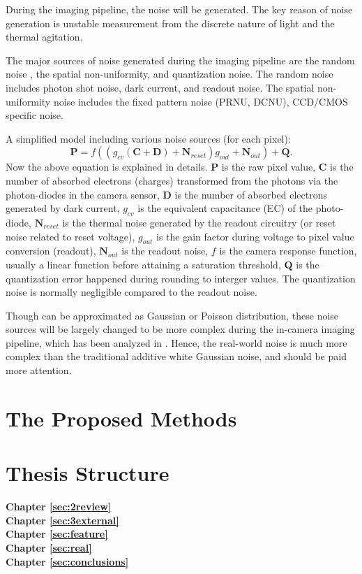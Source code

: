 During the imaging pipeline, the noise will be generated. The key reason of noise generation is unstable measurement from the discrete nature of light and the thermal agitation. 

The major sources of noise generated during the imaging pipeline are the random noise , the spatial non-uniformity, and quantization noise. The random noise includes photon shot noise, dark current, and readout noise. The spatial non-uniformity noise includes the fixed pattern noise (PRNU, DCNU), CCD/CMOS specific noise. 


A simplified model including various noise sources (for each pixel):
\begin{equation}
\bm{P} = f((g_{cv}(\bm{C}+\bm{D})+\bm{N}_{reset})g_{out}+\bm{N}_{out})+\bm{Q}.
\end{equation}
Now the above equation is explained in details. 
$\bm{P}$ is the raw pixel value, 
$\bm{C}$ is the number of absorbed electrons (charges) transformed from the photons via the photon-diodes in the camera sensor,
$\bm{D}$ is the number of absorbed electrons generated by dark current,
$g_{cv}$ is the equivalent capacitance (EC) of the photo-diode,
$\bm{N}_{reset}$ is the thermal noise generated by the readout circuitry (or reset noise related to reset voltage),
$g_{out}$ is the gain factor during voltage to pixel value conversion (readout),
$\bm{N}_{out}$ is the readout noise,
$f$ is the camera response function, usually a linear function before attaining a saturation threshold,
$\bm{Q}$ is the quantization error happened during rounding to interger values. The quantization noise is normally negligible compared to the readout noise.

Though can be approximated as Gaussian or Poisson distribution, these noise sources will be largely changed to be more complex during the in-camera imaging pipeline, which has been analyzed in \cite{crosschannel}. Hence, the real-world noise is much more complex than the traditional additive white Gaussian noise, and should be paid more attention.


\section{The Proposed Methods}
\label{sec:intro:new}




\section{Thesis Structure}
\label{sec:intro:structure}


\textbf{Chapter \ref{sec:2review}} \\[0.2em]





\textbf{Chapter \ref{sec:3external}} \\[0.2em]




\textbf{Chapter \ref{sec:feature}} \\[0.2em]





\textbf{Chapter \ref{sec:real}} \\[0.2em]





\textbf{Chapter \ref{sec:conclusions}} \\[0.2em]





